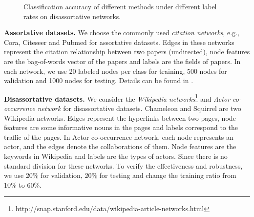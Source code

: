 \documentclass[letterpaper]{article} %
\begin{document}
\begin{figure}
\centering
{}
\caption{Classification accuracy of different methods under different label rates on disassortative networks.}
\label{disassortative}
\end{figure}    

\textbf{Assortative datasets.} We choose the commonly used \emph{citation networks}, e.g., Cora, Citeseer and Pubmed for assortative datasets. Edges in these networks represent the citation relationship between two papers (undirected), node features are the bag-of-words vector of the papers and labels are the fields of papers. In each network, we use 20 labeled nodes per class for training, 500 nodes for validation and 1000 nodes for testing. Details can be found in \cite{GCN}.

\noindent
\textbf{Disassortative datasets.} We consider the \emph{Wikipedia networks}\footnote{http://snap.stanford.edu/data/wikipedia-article-networks.html} and \emph{Actor co-occurrence network} \cite{actornet} for disassortative datasets. 
Chameleon and Squirrel are two Wikipedia networks. Edges represent the hyperlinks between two pages, node features are some informative nouns in the pages and labels correspond to the traffic of the pages.
In Actor co-occurrence network, each node represents an actor, and the edges denote the collaborations of them. Node features are the keywords in Wikipedia and labels are the types of actors. 
Since there is no standard division for these networks. To verify the effectiveness and robustness, we use 20\% for validation, 20\% for testing and change the training ratio from 10\% to 60\%. 
\end{document}
